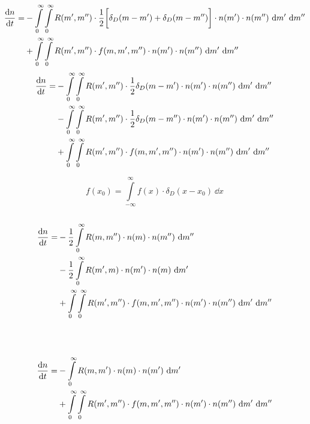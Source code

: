         \begin{align}
            \frac{\text{d} n}{\text{d} t} =
            &-\int\limits_0^\infty \int\limits_0^\infty R(m',m'') \cdot 
                \frac{1}{2}\bigg[\delta_D(m-m')+\delta_D(m-m'')\bigg]
                \cdot n(m') \cdot n(m'') \ \text dm' \ \text dm'' \\
            &+\int\limits_0^\infty \int\limits_0^\infty R(m',m'') \cdot f(m,m',m'')
                \cdot n(m') \cdot n(m'') \ \text dm' \ \text dm'' 
        \end{align}
        \begin{align}
            \frac{\text{d} n}{\text{d} t} =
            &-\int\limits_0^\infty \int\limits_0^\infty R(m',m'') \cdot \frac{1}{2}\delta_D(m-m')
                \cdot n(m') \cdot n(m'') \ \text dm' \ \text dm'' \\
            &-\int\limits_0^\infty \int\limits_0^\infty R(m',m'') \cdot \frac{1}{2}\delta_D(m-m'')
                \cdot n(m') \cdot n(m'') \ \text dm' \ \text dm'' \\
            &+\int\limits_0^\infty \int\limits_0^\infty R(m',m'') \cdot f(m,m',m'')
                \cdot n(m') \cdot n(m'') \ \text dm' \ \text dm''
        \end{align}

        \begin{equation}
            f(x_0) = \int\limits_{-\infty}^{\infty} f(x) \cdot \delta_D(x-x_0) \ \dd x 
        \end{equation}
         \\

        \begin{align}
            \frac{\text{d} n}{\text{d} t} =
            &-\frac{1}{2} \int\limits_0^\infty R(m,m'') \cdot n(m) \cdot n(m'') \ \text dm'' \\
            &-\frac{1}{2} \int\limits_0^\infty R(m',m) \cdot n(m') \cdot n(m) \ \text dm' \\
            &+\int\limits_0^\infty \int\limits_0^\infty R(m',m'') \cdot f(m,m',m'')
                \cdot n(m') \cdot n(m'') \ \text dm' \ \text dm''
        \end{align}

         \\
         \\
        \begin{align}
            \deriv{n}{t} =
            &-\int\limits_0^\infty R(m,m') \cdot n(m) \cdot n(m') \ \text dm' \\
            &+\int\limits_0^\infty \int\limits_0^\infty R(m',m'') \cdot f(m,m',m'')
                \cdot n(m') \cdot n(m'') \ \text dm' \ \text dm''
        \end{align}

